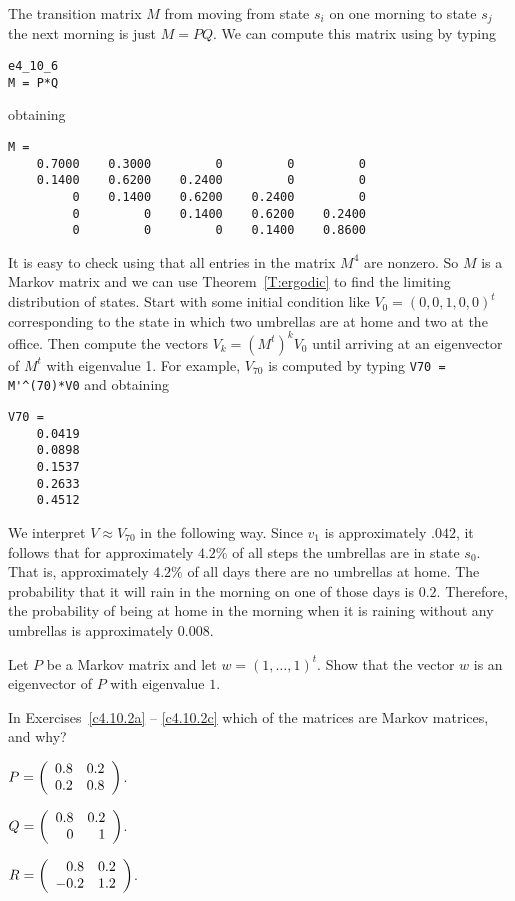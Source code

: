 The transition matrix $M$ from
moving from state $s_i$ on one morning to
state $s_j$ the next morning is just $M=PQ$.  We can compute this matrix
using \Matlab by typing
\begin{verbatim}
e4_10_6
M = P*Q
\end{verbatim}
obtaining
\begin{verbatim}
M =
    0.7000    0.3000         0         0         0
    0.1400    0.6200    0.2400         0         0
         0    0.1400    0.6200    0.2400         0
         0         0    0.1400    0.6200    0.2400
         0         0         0    0.1400    0.8600
\end{verbatim}
It is easy to check using \Matlab that all entries in the matrix $M^4$ are
nonzero.  So $M$ is a Markov matrix and we can use
Theorem~\ref{T:ergodic}
to find the limiting distribution of states.  Start with some initial
condition like $V_0=(0,0,1,0,0)^t$ corresponding to the state in which two
umbrellas are at home and two at the office.  Then compute the vectors
$V_k=(M^t)^kV_0$ until arriving at an eigenvector of $M^t$ with eigenvalue 1.
For example, $V_{70}$ is computed by typing \verb+V70 = M'^(70)*V0+ and
obtaining
\begin{verbatim}
V70 =
    0.0419
    0.0898
    0.1537
    0.2633
    0.4512
\end{verbatim}
We interpret $V\approx V_{70}$ in the following way.  Since $v_1$ is
approximately $.042$, it follows that for approximately $4.2\%$ of all steps 
the umbrellas are in state $s_0$.  That is, approximately $4.2\%$ of all days 
there are no umbrellas at home.  The probability that it will rain in the 
morning on one of those days is $0.2$.  Therefore, the probability of being 
at home in the morning when it is raining without any umbrellas is 
approximately $0.008$.





\EXER

\TEXER

\begin{exercise} \label{c4.10.1}
Let $P$ be a Markov matrix and let $w=(1,\ldots,1)^t$.  Show that
the vector $w$ is an eigenvector of $P$ with eigenvalue $1$.
\end{exercise}

\noindent In Exercises~\ref{c4.10.2a} -- \ref{c4.10.2c} which of the
matrices are Markov matrices, and why?
\begin{exercise} \label{c4.10.2a}
$P = \left(\begin{array}{rr} 0.8 & 0.2\\ 0.2 &0.8\end{array}\right)$.
\end{exercise}
\begin{exercise} \label{c4.10.2b}
$Q = \left(\begin{array}{rr} 0.8 & 0.2\\ 0 &1\end{array}\right)$.
\end{exercise}
\begin{exercise} \label{c4.10.2c}
$R = \left(\begin{array}{rr} 0.8 & 0.2\\ -0.2 &1.2\end{array}\right)$.
\end{exercise}

